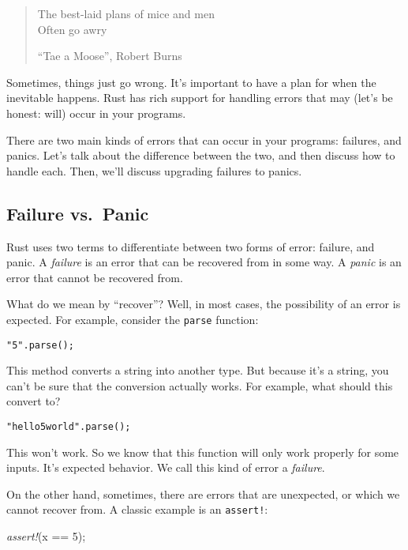 \documentclass[a4paper,]{book}
\newenvironment{Shaded}{\begin{snugshade}}{\end{snugshade}}
\newcommand{\DecValTok}[1]{\textcolor[rgb]{0.00,0.00,0.81}{{#1}}}
\newcommand{\PreprocessorTok}[1]{\textcolor[rgb]{0.56,0.35,0.01}{\textit{{#1}}}}
\newcommand{\NormalTok}[1]{{#1}}
\begin{document}
\begin{quote}
The best-laid plans of mice and men\\
Often go awry

``Tae a Moose'', Robert Burns
\end{quote}

Sometimes, things just go wrong. It's important to have a plan for when
the inevitable happens. Rust has rich support for handling errors that
may (let's be honest: will) occur in your programs.

There are two main kinds of errors that can occur in your programs:
failures, and panics. Let's talk about the difference between the two,
and then discuss how to handle each. Then, we'll discuss upgrading
failures to panics.

\subsection{Failure vs.~Panic}\label{failure-vs.panic}

Rust uses two terms to differentiate between two forms of error:
failure, and panic. A \emph{failure} is an error that can be recovered
from in some way. A \emph{panic} is an error that cannot be recovered
from.

What do we mean by ``recover''? Well, in most cases, the possibility of
an error is expected. For example, consider the \texttt{parse} function:

\begin{verbatim}
"5".parse();
\end{verbatim}

This method converts a string into another type. But because it's a
string, you can't be sure that the conversion actually works. For
example, what should this convert to?

\begin{verbatim}
"hello5world".parse();
\end{verbatim}

This won't work. So we know that this function will only work properly
for some inputs. It's expected behavior. We call this kind of error a
\emph{failure}.

On the other hand, sometimes, there are errors that are unexpected, or
which we cannot recover from. A classic example is an \texttt{assert!}:

\begin{Shaded}
\begin{Highlighting}[]
\PreprocessorTok{assert!}\NormalTok{(x == }\DecValTok{5}\NormalTok{);}
\end{Highlighting}
\end{Shaded}
\end{document}
